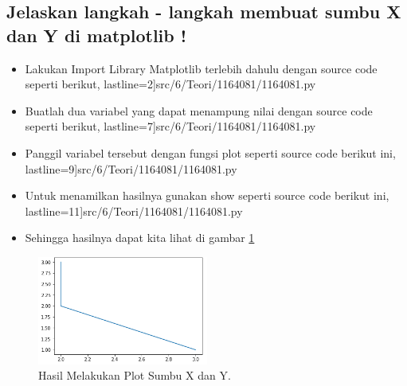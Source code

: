 \subsection{Jelaskan langkah - langkah membuat sumbu X dan Y di matplotlib !}
\begin{itemize}
	\item Lakukan Import Library Matplotlib terlebih dahulu dengan source code seperti berikut,
		 lastline=2]{src/6/Teori/1164081/1164081.py}
	\item Buatlah dua variabel yang dapat menampung nilai dengan source code seperti berikut,
		 lastline=7]{src/6/Teori/1164081/1164081.py}
	\item Panggil variabel tersebut dengan fungsi plot seperti source code berikut ini,
		 lastline=9]{src/6/Teori/1164081/1164081.py}
	\item Untuk menamilkan hasilnya gunakan show seperti source code berikut ini,
		 lastline=11]{src/6/Teori/1164081/1164081.py}
	\item Sehingga hasilnya dapat kita lihat di gambar \ref{1}
\end{itemize}

	\begin{figure}[!htbp!]
		\centerline{\includegraphics[width=0.5\textwidth]{figures/6/Teori/1164081/1164081_1.png}}
		\caption{Hasil Melakukan Plot Sumbu X dan Y.}
		\label{1}
	\end{figure}
